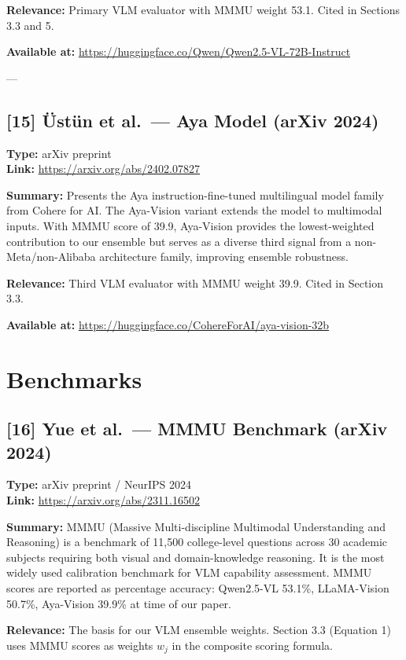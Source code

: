 \documentclass[11pt]{article}
\begin{document}
\textbf{Relevance:} Primary VLM evaluator with MMMU weight 53.1. Cited in Sections 3.3 and 5.

\textbf{Available at:} \url{https://huggingface.co/Qwen/Qwen2.5-VL-72B-Instruct}

---

\subsection*{[15] Üstün et al.\ — Aya Model (arXiv 2024)}
\textbf{Type:} arXiv preprint \\
\textbf{Link:} \url{https://arxiv.org/abs/2402.07827}

\textbf{Summary:} Presents the Aya instruction-fine-tuned multilingual model family from Cohere for AI. The Aya-Vision variant extends the model to multimodal inputs. With MMMU score of 39.9, Aya-Vision provides the lowest-weighted contribution to our ensemble but serves as a diverse third signal from a non-Meta/non-Alibaba architecture family, improving ensemble robustness.

\textbf{Relevance:} Third VLM evaluator with MMMU weight 39.9. Cited in Section 3.3.

\textbf{Available at:} \url{https://huggingface.co/CohereForAI/aya-vision-32b}

\section{Benchmarks}

\subsection*{[16] Yue et al.\ — MMMU Benchmark (arXiv 2024)}
\textbf{Type:} arXiv preprint / NeurIPS 2024 \\
\textbf{Link:} \url{https://arxiv.org/abs/2311.16502}

\textbf{Summary:} MMMU (Massive Multi-discipline Multimodal Understanding and Reasoning) is a benchmark of 11,500 college-level questions across 30 academic subjects requiring both visual and domain-knowledge reasoning. It is the most widely used calibration benchmark for VLM capability assessment. MMMU scores are reported as percentage accuracy: Qwen2.5-VL 53.1\%, LLaMA-Vision 50.7\%, Aya-Vision 39.9\% at time of our paper.

\textbf{Relevance:} The basis for our VLM ensemble weights. Section 3.3 (Equation 1) uses MMMU scores as weights $w_j$ in the composite scoring formula.
\end{document}
